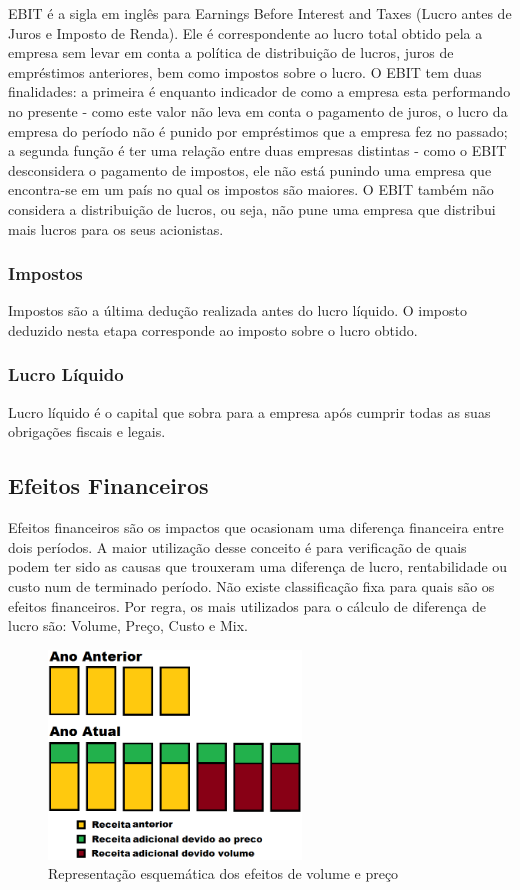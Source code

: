 \documentclass[12pt]{article}
\begin{document}
	EBIT é a sigla em inglês para Earnings Before Interest and Taxes (Lucro antes de Juros e Imposto de Renda). Ele é correspondente ao lucro total obtido pela a empresa sem levar em conta a política de distribuição de lucros, juros de empréstimos anteriores, bem como impostos sobre o lucro. O EBIT tem duas finalidades: a primeira é enquanto indicador de como a empresa esta performando no presente - como este valor não leva em conta o pagamento de juros, o lucro da empresa do período não é punido por empréstimos que a empresa fez no passado; a segunda função é ter uma relação entre duas empresas distintas - como o EBIT desconsidera o pagamento de impostos, ele não está punindo uma empresa que encontra-se em um país no qual os impostos são maiores. O EBIT também não considera a distribuição de lucros, ou seja, não pune uma empresa que distribui mais lucros para os seus acionistas.

\subsubsection{Impostos}

	Impostos são a última dedução realizada antes do lucro líquido. O imposto deduzido nesta etapa corresponde ao imposto sobre o lucro obtido.

\subsubsection{Lucro Líquido}

	Lucro líquido é o capital que sobra para a empresa após cumprir todas as suas obrigações fiscais e legais.

\subsection{Efeitos Financeiros}

	Efeitos financeiros são os impactos que ocasionam uma diferença financeira entre dois períodos. A maior utilização desse conceito é para verificação de quais podem ter sido as causas que trouxeram uma diferença de lucro, rentabilidade ou custo num de terminado período. Não existe classificação fixa para quais são os efeitos financeiros. Por regra, os mais utilizados para o cálculo de diferença de lucro são: Volume, Preço, Custo e Mix.

\begin{figure}[h!]
	\centering
	\includegraphics[width=0.6\textwidth]{img/effects.png}
	\caption{Representação esquemática dos efeitos de volume e preço}
	\label{fig:effects}
\end{figure}
\end{document}
